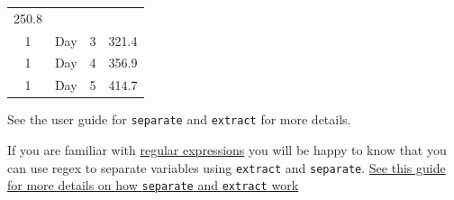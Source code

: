 \documentclass[]{article}
\theoremstyle{definition}
\theoremstyle{definition}
\theoremstyle{definition}
\theoremstyle{remark}
\begin{document}
\begin{longtable}[]{@{}cccc@{}}
\begin{minipage}[t]{0.09\columnwidth}
250.8\strut
\end{minipage}\tabularnewline
\begin{minipage}[t]{0.12\columnwidth}\centering\strut
1\strut
\end{minipage} & \begin{minipage}[t]{0.14\columnwidth}\centering\strut
Day\strut
\end{minipage} & \begin{minipage}[t]{0.07\columnwidth}\centering\strut
3\strut
\end{minipage} & \begin{minipage}[t]{0.09\columnwidth}\centering\strut
321.4\strut
\end{minipage}\tabularnewline
\begin{minipage}[t]{0.12\columnwidth}\centering\strut
1\strut
\end{minipage} & \begin{minipage}[t]{0.14\columnwidth}\centering\strut
Day\strut
\end{minipage} & \begin{minipage}[t]{0.07\columnwidth}\centering\strut
4\strut
\end{minipage} & \begin{minipage}[t]{0.09\columnwidth}\centering\strut
356.9\strut
\end{minipage}\tabularnewline
\begin{minipage}[t]{0.12\columnwidth}\centering\strut
1\strut
\end{minipage} & \begin{minipage}[t]{0.14\columnwidth}\centering\strut
Day\strut
\end{minipage} & \begin{minipage}[t]{0.07\columnwidth}\centering\strut
5\strut
\end{minipage} & \begin{minipage}[t]{0.09\columnwidth}\centering\strut
414.7\strut
\end{minipage}\tabularnewline
\bottomrule
\end{longtable}

See the user guide for \texttt{separate} and \texttt{extract} for more
details.

{If you are familiar with
\href{https://code.tutsplus.com/tutorials/you-dont-know-anything-about-regular-expressions-a-complete-guide--net-7869}{regular
expressions} you will be happy to know that you can use regex to
separate variables using \texttt{extract} and \texttt{separate}.
\href{https://rpubs.com/bradleyboehmke/data_wrangling}{See this guide
for more details on how \texttt{separate} and \texttt{extract} work}}
\end{document}
